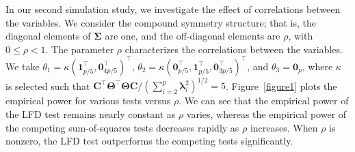 \documentclass[12pt]{article} %
\newcommand{\bC}{\mathbf{C}}
\newcommand{\bfsym}[1]{\ensuremath{\boldsymbol{#1}}}
\def\blambda {\bfsym {\lambda}}
\def\bSigma {\bfsym {\Sigma}}
\def\bTheta {\bfsym {\Theta}}
\theoremstyle{definition}
\begin{document}
In our second simulation study, we investigate the effect of correlations between the variables.
We consider the compound symmetry structure; that is, the diagonal elements of $\bSigma$ are one, and the off-diagonal elements are $\rho$, with $0\leq \rho<1$.
The parameter $\rho$ characterizes the correlations between the variables.
We take 
$\theta_1=\kappa (\mathbf 1_{p/5}^\top,\mathbf{0}_{4p/5}^\top)^\top$, $\theta_2=\kappa (\mathbf{0}_{p/5}^\top, \mathbf 1_{p/5}^\top,\mathbf{0}_{3p/5}^\top)^\top$,
and $\theta_3=\mathbf{0}_p$, where $\kappa$ is selected such that ${ \bC^\top \bTheta^\top \bTheta\bC}/(\sum_{i=2}^p\blambda_i^2)^{1/2}=5$.
Figure~\ref{figure1} plots the empirical power for various tests versus $\rho$.
We can see that the empirical power of the LFD test remains nearly constant as $\rho$ varies, whereas the empirical power of the competing sum-of-squares tests decreases rapidly as $\rho$ increases.
When $\rho$ is nonzero, the LFD test outperforms the competing tests significantly.
\end{document}

